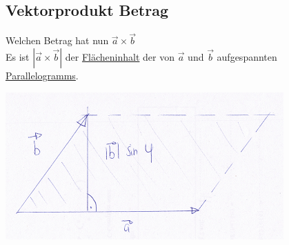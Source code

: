  \subsection{Vektorprodukt Betrag}
 Welchen Betrag hat nun $\vec{a} \times \vec{b}$\\
Es ist $|\vec{a} \times \vec{b}|$ der \underline{Flächeninhalt} der von $\vec{a}$ und $\vec{b}$ aufgespannten \underline{Parallelogramms}.
 \begin{center}
	 \includegraphics[width=0.8\textwidth]{imgs/kreuzprodukt_flaecheninhalt.png}
 \end{center}
